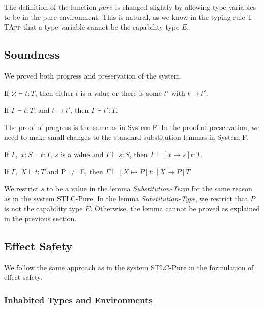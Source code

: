 The definition of the function $pure$ is changed slightly by allowing
type variables to be in the pure environment. This is natural, as we
know in the typing rule \textsc{T-TApp} that a type variable cannot be
the capability type $E$.

\subsection{Soundness}

We proved both progress and preservation of the system.

\begin{theorem}[Progress]
If $\varnothing \vdash t : T$, then either $t$ is a value or there is some
$t'$ with $t \longrightarrow t'$.
\end{theorem}

\begin{theorem}[Preservation]
If $\Gamma \vdash t : T$, and $t \longrightarrow t'$, then $\Gamma
\vdash t' : T$.
\end{theorem}

The proof of progress is the same as in System F. In the proof of
preservation, we need to make small changes to the standard
substitution lemmas in System F.

\begin{lemma}
  If $\Gamma,\; x:S \vdash t : T$, $s$ is a value and
  $\Gamma \vdash s : S$, then $\Gamma \vdash [x \mapsto s]t : T$.
\end{lemma}

\begin{lemma}
  If $\Gamma,\; X \vdash t : T$ and P $\neq$ E,
  then $\Gamma \vdash [X \mapsto P]t : [X \mapsto P]T$.
\end{lemma}

We restrict $s$ to be a value in the lemma \emph{Substitution-Term}
for the same reason as in the system STLC-Pure. In the lemma
\emph{Substitution-Type}, we restrict that $P$ is not the capability
type $E$. Otherwise, the lemma cannot be proved as explained in the
previous section.

\subsection{Effect Safety}

We follow the same approach as in the system STLC-Pure in the
formulation of effect safety.

\subsubsection{Inhabited Types and Environments}

